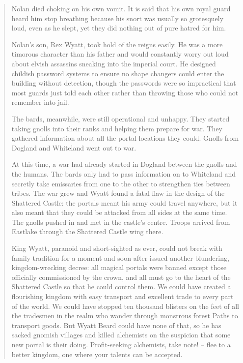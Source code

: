 \begin{quotation}

	Nolan died choking on his own vomit.  It is said that his own royal guard heard him stop breathing because his snort was usually so grotesquely loud, even as he slept, yet they did nothing out of pure hatred for him.

	Nolan's son, Rex Wyatt, took hold of the reigns easily.  He was a more timorous character than his father and would constantly worry out loud about elvish assassins sneaking into the imperial court.  He designed childish password systems to ensure no shape changers could enter the building without detection, though the passwords were so impractical that most guards just told each other rather than throwing those who could not remember into jail.

	The bards, meanwhile, were still operational and unhappy.  They started taking gnolls into their ranks and helping them prepare for war.  They gathered information about all the portal locations they could.  Gnolls from Dogland and Whiteland went out to war.

	At this time, a war had already started in Dogland between the gnolls and the humans.  The bards only had to pass information on to Whiteland and secretly take emissaries from one to the other to strengthen ties between tribes.  The war grew and Wyatt found a fatal flaw in the design of the Shattered Castle: the portals meant his army could travel anywhere, but it also meant that they could be attacked from all sides at the same time.  The gnolls pushed in and met in the castle's centre.  Troops arrived from Eastlake through the Shattered Castle wing there.

	King Wyatt, paranoid and short-sighted as ever, could not break with family tradition for a moment and soon after issued another blundering, kingdom-wrecking decree: all magical portals were banned except those officially commissioned by the crown, and all must go to the heart of the Shattered Castle so that he could control them.  We could have created a flourishing kingdom with easy transport and excellent trade to every part of the world.  We could have stopped ten thousand blisters on the feet of all the tradesmen in the realm who wander through monstrous forest Paths to transport goods.  But Wyatt Beard could have none of that, so he has sacked gnomish villages and killed alchemists on the suspicion that some new portal is their doing.  Profit-seeking alchemists, take note! -- flee to a better kingdom, one where your talents can be accepted.

\end{quotation}

